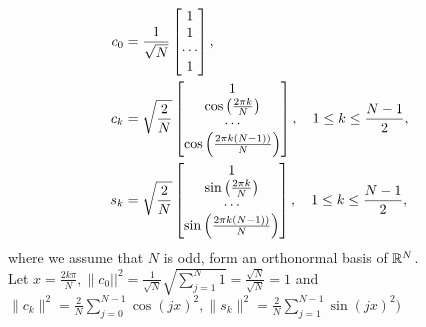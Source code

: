\documentclass[12pt,twoside]{article}
\begin{document}
\begin{enumerate}
\begin{enumerate}
  \begin{align}
 c_0 & = \frac{1}{\sqrt{N}}\begin{bmatrix} 1 \\ 1 \\ \cdots \\ 1 \end{bmatrix},\\
c_k & = \sqrt{\frac{2}{N}}\begin{bmatrix} 1 \\ \cos \left( \frac{2 \pi k }{N} \right) \\ \cdots \\ \cos \left( \frac{2 \pi k (N-1))}{N} \right) \end{bmatrix}, \quad 1 \leq k \leq \frac{N-1}{2},\\
 s_k & = \sqrt{\frac{2}{N}}\begin{bmatrix} 1 \\ \sin \left( \frac{2 \pi k }{N} \right) \\ \cdots \\ \sin \left( \frac{2 \pi k (N-1))}{N} \right) \end{bmatrix}, \quad 1 \leq k \leq \frac{N-1}{2},
 \end{align}
 where we assume that $N$ is odd, form an orthonormal basis of $\mathbb{R}^{N}$.\\
 
 Let $x=\frac{2 k \pi}{N}, \|c_0||^2 =  \frac{1}{\sqrt{N}} \sqrt{\sum_{j=1}^N 1} = \frac{\sqrt{N}} {\sqrt{N}} = 1$ 
and $\|c_k\|^2 = \frac{2}{N} \sum_{j=0}^{N-1} \cos(j x)^2, \|s_k\|^2 = \frac{2}{N} \sum_{j=1}^{N-1} \sin(j x)^2)$
 

\end{enumerate}
\end{enumerate}
\end{document}
